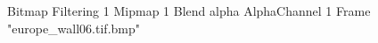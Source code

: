 {Bitmap
	{Filtering 1}
	{Mipmap 1}
	{Blend alpha}
	{AlphaChannel 1}
	{Frame "europe_wall06.tif.bmp"}
}

